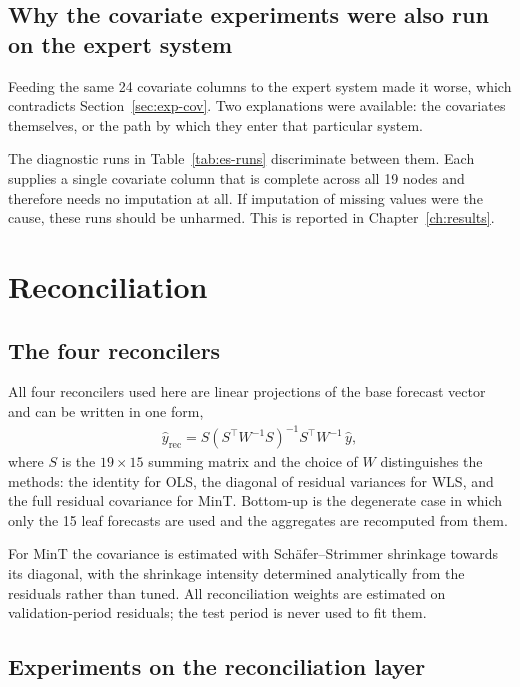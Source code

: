 \subsection{Why the covariate experiments were also run on the expert system}
\label{sec:exp-cov-es}

Feeding the same 24 covariate columns to the expert system made it worse, which
contradicts Section~\ref{sec:exp-cov}. Two explanations were available: the covariates
themselves, or the path by which they enter that particular system.

The diagnostic runs in Table~\ref{tab:es-runs} discriminate between them. Each supplies a
single covariate column that is complete across all 19 nodes and therefore needs no
imputation at all. If imputation of missing values were the cause, these runs should be
unharmed. This is reported in Chapter~\ref{ch:results}.

\section{Reconciliation}
\label{sec:exp-recon}

\subsection{The four reconcilers}

All four reconcilers used here are linear projections of the base forecast vector and can
be written in one form,
\begin{eqnarray}\label{eqn:recon}
\hat{y}_{\mathrm{rec}} = S\left(S^{\top} W^{-1} S\right)^{-1} S^{\top} W^{-1}\, \hat{y},
\end{eqnarray}
where $S$ is the $19 \times 15$ summing matrix and the choice of $W$ distinguishes the
methods: the identity for OLS, the diagonal of residual variances for WLS, and the full
residual covariance for MinT. Bottom-up is the degenerate case in which only the 15 leaf
forecasts are used and the aggregates are recomputed from them.

For MinT the covariance is estimated with Schäfer--Strimmer shrinkage towards its
diagonal, with the shrinkage intensity determined analytically from the residuals rather
than tuned. All reconciliation weights are estimated on validation-period residuals; the
test period is never used to fit them.

\subsection{Experiments on the reconciliation layer}

